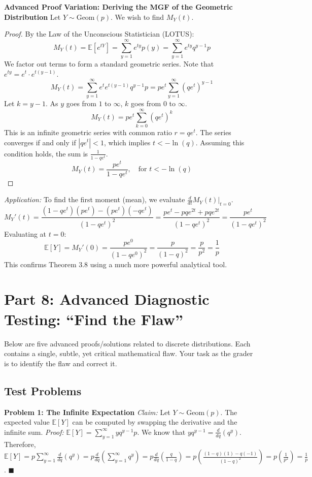 \documentclass[11pt, letterpaper]{article}
\theoremstyle{definition}
\theoremstyle{remark}
\newcommand{\E}{\mathbb{E}}
\begin{document}
\textbf{Advanced Proof Variation: Deriving the MGF of the Geometric Distribution}
Let $Y \sim \mathrm{Geom}(p)$. We wish to find $M_Y(t)$.
\begin{proof}
By the Law of the Unconscious Statistician (LOTUS):
\[ M_Y(t) = \E[e^{tY}] = \sum_{y=1}^\infty e^{ty} p(y) = \sum_{y=1}^\infty e^{ty} q^{y-1} p \]
We factor out terms to form a standard geometric series. Note that $e^{ty} = e^t \cdot e^{t(y-1)}$.
\[ M_Y(t) = \sum_{y=1}^\infty e^t e^{t(y-1)} q^{y-1} p = p e^t \sum_{y=1}^\infty (q e^t)^{y-1} \]
Let $k = y - 1$. As $y$ goes from $1$ to $\infty$, $k$ goes from $0$ to $\infty$.
\[ M_Y(t) = p e^t \sum_{k=0}^\infty (q e^t)^k \]
This is an infinite geometric series with common ratio $r = q e^t$. The series converges if and only if $|q e^t| < 1$, which implies $t < -\ln(q)$.
Assuming this condition holds, the sum is $\frac{1}{1 - q e^t}$.
\[ M_Y(t) = \frac{p e^t}{1 - q e^t}, \quad \text{for } t < -\ln(q) \]
\end{proof}
\textit{Application:} To find the first moment (mean), we evaluate $\frac{d}{dt} M_Y(t) \Big|_{t=0}$.
\[ M_Y'(t) = \frac{(1 - q e^t)(p e^t) - (p e^t)(-q e^t)}{(1 - q e^t)^2} = \frac{p e^t - p q e^{2t} + p q e^{2t}}{(1 - q e^t)^2} = \frac{p e^t}{(1 - q e^t)^2} \]
Evaluating at $t=0$:
\[ \E[Y] = M_Y'(0) = \frac{p e^0}{(1 - q e^0)^2} = \frac{p}{(1-q)^2} = \frac{p}{p^2} = \frac{1}{p} \]
This confirms Theorem 3.8 using a much more powerful analytical tool.

\newpage

\section{Part 8: Advanced Diagnostic Testing: ``Find the Flaw''}

Below are five advanced proofs/solutions related to discrete distributions. Each contains a single, subtle, yet critical mathematical flaw. Your task as the grader is to identify the flaw and correct it.

\subsection{Test Problems}

\textbf{Problem 1: The Infinite Expectation}
\textit{Claim:} Let $Y \sim \mathrm{Geom}(p)$. The expected value $\E[Y]$ can be computed by swapping the derivative and the infinite sum.
\textit{Proof:}
$\E[Y] = \sum_{y=1}^\infty y q^{y-1} p$. We know that $y q^{y-1} = \frac{d}{dq} (q^y)$.
Therefore, $\E[Y] = p \sum_{y=1}^\infty \frac{d}{dq} (q^y) = p \frac{d}{dq} \left( \sum_{y=1}^\infty q^y \right) = p \frac{d}{dq} \left( \frac{q}{1-q} \right) = p \left( \frac{(1-q)(1) - q(-1)}{(1-q)^2} \right) = p \left( \frac{1}{p^2} \right) = \frac{1}{p}$. $\blacksquare$
\end{document}
